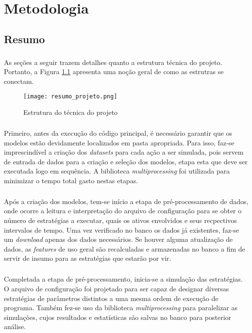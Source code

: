 \chapter{Metodologia}
\label{cap3}

\section{Resumo}

\paragraph{} As seções a seguir trazem detalhes quanto a estrutura técnica do projeto. Portanto, a Figura \ref{fig:100} apresenta uma noção geral de como as estrutras se conectam.

\begin{figure}[h]
    \texttt{[image: resumo\_projeto.png]}
    \centering
    \caption{Estrutura do técnica do projeto}
    \label{fig:100}
\end{figure}

\paragraph{} Primeiro, antes da execução do código principal, é necessário garantir que os modelos estão devidamente localizados em pasta apropriada. Para isso, faz-se imprescindível a criação dos \textit{datasets} para cada ação a ser simulada, pois servem de entrada de dados para a criação e seleção dos modelos, etapa esta que deve ser executada logo em sequência. A biblioteca \textit{multiprocessing} foi utilizada para minimizar o tempo total gasto nestas etapas.

\paragraph{} Após a criação dos modelos, tem-se início a etapa de pré-processamento de dados, onde ocorre a leitura e interpretação do arquivo de configuração para se obter o número de estratégias a executar, quais os ativos envolvidos e seus recpectivos intervalos de tempo. Uma vez verificado no banco os dados já existentes, faz-se um \textit{download} apenas dos dados necessários. Se houver alguma atualização de dados, as \textit{features} de uso geral são recalculadas e armazenadas no banco a fim de servir de insumo para as estratégias que estarão por vir.

\paragraph{} Completada a etapa de pré-processamento, inicia-se a simulação das estratégias. O arquivo de configuração foi projetado para ser capaz de designar diversas estratégias de parâmetros distintos a uma mesma ordem de execução de programa. Também fez-se uso da biblioteca \textit{multiprocessing} para paralelizar as simulações, cujos resultados e estatísticas são salvas no banco para posterior análise.

